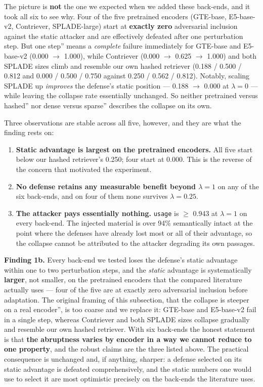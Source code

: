 \documentclass[review,3p,times]{elsarticle}
\newcounter{none}
\providecommand{\tightlist}{%
  \setlength{\itemsep}{0pt}\setlength{\parskip}{0pt}}
\begin{document}
The picture is \textbf{not} the one we expected when we added these back-ends, and it took all six to see why. Four of the five pretrained encoders (GTE-base, E5-base-v2, Contriever, SPLADE-large) start at \textbf{exactly zero} adversarial inclusion against the static attacker and are effectively defeated after one perturbation step. But \texttt{}one step'' means a \emph{complete} failure immediately for GTE-base and E5-base-v2 (0.000 \(\rightarrow\) 1.000), while Contriever (0.000 \(\rightarrow\) 0.625 \(\rightarrow\) 1.000) and both SPLADE sizes climb and resemble our own hashed retriever (0.188 / 0.500 / 0.812 and 0.000 / 0.500 / 0.750 against 0.250 / 0.562 / 0.812). Notably, scaling SPLADE up \emph{improves} the defense's static position --- 0.188 \(\rightarrow\) 0.000 at \(\lambda = 0\) --- while leaving the collapse rate essentially unchanged. So neither \texttt{}pretrained versus hashed'' nor \texttt{}dense versus sparse'' describes the collapse on its own.

Three observations are stable across all five, however, and they are what the finding rests on:

\begin{enumerate}
\def\labelenumi{\arabic{enumi}.}
\tightlist
\item
  \textbf{Static advantage is largest on the pretrained encoders.} All five start below our hashed retriever's 0.250; four start at 0.000. This is the reverse of the concern that motivated the experiment.
\item
  \textbf{No defense retains any measurable benefit beyond \(\lambda = 1\)} on any of the six back-ends, and on four of them none survives \(\lambda = 0.25\).
\item
  \textbf{The attacker pays essentially nothing.} \texttt{usage} is \(\geq\) 0.943 at \(\lambda = 1\) on every back-end. The injected material is over 94\% semantically intact at the point where the defenses have already lost most or all of their advantage, so the collapse cannot be attributed to the attacker degrading its own passages.
\end{enumerate}

\textbf{Finding 1b.} Every back-end we tested loses the defense's static advantage within one to two perturbation steps, and the \emph{static} advantage is systematically \textbf{larger}, not smaller, on the pretrained encoders that the compared literature actually uses --- four of the five are at exactly zero adversarial inclusion before adaptation. The original framing of this subsection, that the collapse is \texttt{}steeper on a real encoder'', is too coarse and we replace it: GTE-base and E5-base-v2 fail in a single step, whereas Contriever and both SPLADE sizes collapse gradually and resemble our own hashed retriever. With six back-ends the honest statement is that \textbf{the abruptness varies by encoder in a way we cannot reduce to one property}, and the robust claims are the three listed above. The practical consequence is unchanged and, if anything, sharper: a defense selected on its static advantage is defeated comprehensively, and the static numbers one would use to select it are most optimistic precisely on the back-ends the literature uses.
\end{document}
